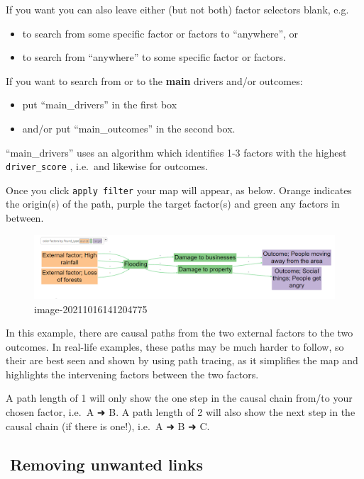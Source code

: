 \documentclass[
]{book}
\providecommand{\tightlist}{%
  \setlength{\itemsep}{0pt}\setlength{\parskip}{0pt}}
\begin{document}
If you want you can also leave either (but not both) factor selectors blank, e.g.

\begin{itemize}
\tightlist
\item
  to search from some specific factor or factors to ``anywhere'', or
\item
  to search from ``anywhere'' to some specific factor or factors.
\end{itemize}

If you want to search from or to the \textbf{main} drivers and/or outcomes:

\begin{itemize}
\tightlist
\item
  put ``main\_drivers'' in the first box
\item
  and/or put ``main\_outcomes'' in the second box.
\end{itemize}

``main\_drivers'' uses an algorithm which identifies 1-3 factors with the highest \texttt{driver\_score} , i.e.~and likewise for outcomes.

Once you click \texttt{apply\ filter} your map will appear, as below. Orange indicates the origin(s) of the path, purple the target factor(s) and green any factors in between.

\begin{figure}
\centering
\includegraphics[width=6.77083in,height=\textheight]{_assets/image-20211016141204775.png}
\caption{image-20211016141204775}
\end{figure}

In this example, there are causal paths from the two external factors to the two outcomes. In real-life examples, these paths may be much harder to follow, so their are best seen and shown by using path tracing, as it simplifies the map and highlights the intervening factors between the two factors.

A path length of 1 will only show the one step in the causal chain from/to your chosen factor, i.e.~A ➜ B. A path length of 2 will also show the next step in the causal chain (if there is one!), i.e.~A ➜ B ➜ C.

\hypertarget{removing-unwanted-links}{%
\subsection{🧪Removing unwanted links}\label{removing-unwanted-links}}
\end{document}
